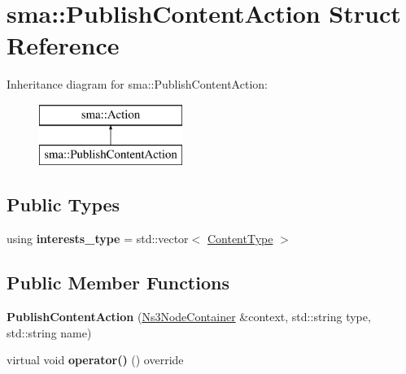 \hypertarget{structsma_1_1PublishContentAction}{\section{sma\-:\-:Publish\-Content\-Action Struct Reference}
\label{structsma_1_1PublishContentAction}
}
Inheritance diagram for sma\-:\-:Publish\-Content\-Action\-:\begin{figure}[H]
\begin{center}
\leavevmode
\includegraphics[height=2.000000cm]{structsma_1_1PublishContentAction}
\end{center}
\end{figure}
\subsection*{Public Types}
\begin{DoxyCompactItemize}
\item 
\hypertarget{structsma_1_1PublishContentAction_ad9ee86a19676ddc8eb0f0aa11c668a3d}{using {\bfseries interests\-\_\-type} = std\-::vector$<$ \hyperlink{structsma_1_1ContentType}{Content\-Type} $>$}\label{structsma_1_1PublishContentAction_ad9ee86a19676ddc8eb0f0aa11c668a3d}

\end{DoxyCompactItemize}
\subsection*{Public Member Functions}
\begin{DoxyCompactItemize}
\item 
\hypertarget{structsma_1_1PublishContentAction_a62e96635126393f4d2ddba1773519fc8}{{\bfseries Publish\-Content\-Action} (\hyperlink{classsma_1_1Ns3NodeContainer}{Ns3\-Node\-Container} \&context, std\-::string type, std\-::string name)}\label{structsma_1_1PublishContentAction_a62e96635126393f4d2ddba1773519fc8}

\item 
\hypertarget{structsma_1_1PublishContentAction_a6874c56db603ff2feb52d9fbadf9f5cd}{virtual void {\bfseries operator()} () override}\label{structsma_1_1PublishContentAction_a6874c56db603ff2feb52d9fbadf9f5cd}

\end{DoxyCompactItemize}
